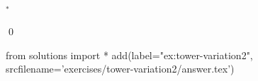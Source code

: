 
\begin{ex}$^*$
  \label{ex:tower-variation2}
  
  \qed
\end{ex} 
\begin{python0}
from solutions import *
add(label="ex:tower-variation2",
    srcfilename='exercises/tower-variation2/answer.tex') 
\end{python0}
